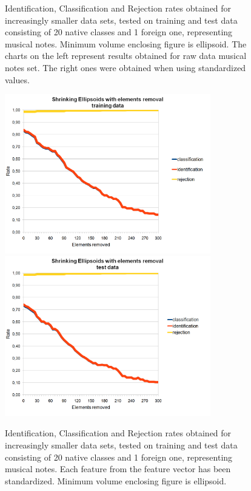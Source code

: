 \begin{figure}[htp]
	\caption{ Identification, Classification and Rejection rates obtained for increasingly smaller data sets, tested on training and test data consisting of 20 native classes and 1 foreign one, representing musical notes. Minimum volume enclosing figure is ellipsoid. The charts on the left represent results obtained for raw data musical notes set. The right ones were obtained when using standardized values. }
\end{figure}

\begin{figure}[htp]
	\centering
	\includegraphics[width=0.80\textwidth]{Figures/charts/MUSIC_NOTES_STANDARIZED/DIGITS_ShrinkingEllipsoidsElementsRemovalTraining.png}
	\hspace{12pt}
	\includegraphics[width=0.80\textwidth]{Figures/charts/MUSIC_NOTES_STANDARIZED/DIGITS_ShrinkingEllipsoidsElementsRemovalTest.png}
	\caption{ Identification, Classification and Rejection rates obtained for increasingly smaller data sets, tested on training and test data consisting of 20 native classes and 1 foreign one, representing musical notes. Each feature from the feature vector has been standardized. Minimum volume enclosing figure is ellipsoid. }
\end{figure}


